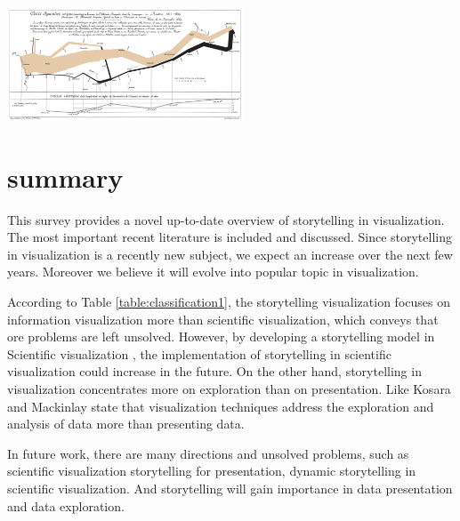 \documentclass{egpubl}
\begin{document}
\begingroup
\centering
\includegraphics[width=7cm]{./images/StorytellingTheNextStepForVisualisation}
\label{fig:StorytellingTheNextStepForVisualisation}
\endgroup


\section{summary}
This survey provides a novel up-to-date overview of storytelling in visualization. The most important recent literature is included and discussed. Since storytelling in visualization is a recently new subject, we expect an increase over the next few years. Moreover we believe it will evolve into popular topic in visualization.


According to Table \ref{table:classification1}, the storytelling visualization focuses on information visualization more than scientific visualization, which conveys that ore problems are left unsolved. However, by developing a storytelling model in Scientific visualization \cite{wohlfart2}, the implementation of storytelling in scientific visualization could increase in the future. On the other hand, storytelling in visualization concentrates more on exploration than on presentation. Like  Kosara and Mackinlay \cite{Kosara} state that visualization techniques address the exploration and analysis of data more than presenting data.

In future work, there are many directions and unsolved problems, such as scientific visualization storytelling for presentation, dynamic storytelling in scientific visualization. And storytelling will gain importance in data presentation and data exploration.



\newpage
%



\end{document}
